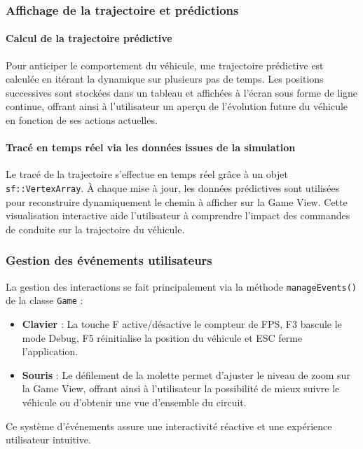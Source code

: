 \subsubsection{Affichage de la trajectoire et prédictions}\label{subsubsec:affichage-de-la-trajectoire-et-predictions}

\paragraph{Calcul de la trajectoire prédictive}
Pour anticiper le comportement du véhicule, une trajectoire prédictive est calculée en itérant la dynamique sur plusieurs pas de temps.
Les positions successives sont stockées dans un tableau et affichées à l'écran sous forme de ligne continue, offrant ainsi à l'utilisateur un aperçu de l'évolution future du véhicule en fonction de ses actions actuelles.

\paragraph{Tracé en temps réel via les données issues de la simulation}
Le tracé de la trajectoire s'effectue en temps réel grâce à un objet \texttt{sf::VertexArray}.
À chaque mise à jour, les données prédictives sont utilisées pour reconstruire dynamiquement le chemin à afficher sur la Game View.
Cette visualisation interactive aide l'utilisateur à comprendre l'impact des commandes de conduite sur la trajectoire du véhicule.

\subsubsection{Gestion des événements utilisateurs}\label{subsubsec:gestion-des-evenements-utilisateurs}
La gestion des interactions se fait principalement via la méthode \texttt{manageEvents()} de la classe \texttt{Game} :
\begin{itemize}
    \item \textbf{Clavier} : La touche F active/désactive le compteur de FPS, F3 bascule le mode Debug, F5 réinitialise la position du véhicule et ESC ferme l'application.
    \item \textbf{Souris} : Le défilement de la molette permet d'ajuster le niveau de zoom sur la Game View, offrant ainsi à l'utilisateur la possibilité de mieux suivre le véhicule ou d'obtenir une vue d'ensemble du circuit.
\end{itemize}
Ce système d'événements assure une interactivité réactive et une expérience utilisateur intuitive.

